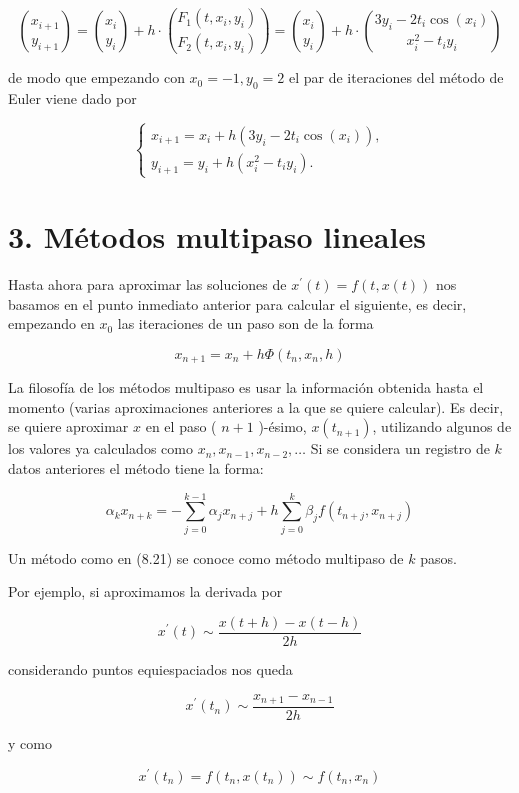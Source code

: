 \documentclass[10pt]{article}
\begin{document}
$$
\binom{x_{i+1}}{y_{i+1}}=\binom{x_{i}}{y_{i}}+h \cdot\binom{F_{1}\left(t, x_{i}, y_{i}\right)}{F_{2}\left(t, x_{i}, y_{i}\right)}=\binom{x_{i}}{y_{i}}+h \cdot\binom{3 y_{i}-2 t_{i} \cos \left(x_{i}\right)}{x_{i}^{2}-t_{i} y_{i}}
$$

de modo que empezando con $x_{0}=-1, y_{0}=2$ el par de iteraciones del método de Euler viene dado por

$$
\left\{\begin{array}{l}
x_{i+1}=x_{i}+h\left(3 y_{i}-2 t_{i} \cos \left(x_{i}\right)\right), \\
y_{i+1}=y_{i}+h\left(x_{i}^{2}-t_{i} y_{i}\right) .
\end{array}\right.
$$

\section*{3. Métodos multipaso lineales}
Hasta ahora para aproximar las soluciones de $x^{\prime}(t)=f(t, x(t))$ nos basamos en el punto inmediato anterior para calcular el siguiente, es decir, empezando en $x_{0}$ las iteraciones de un paso son de la forma

$$
x_{n+1}=x_{n}+h \Phi\left(t_{n}, x_{n}, h\right)
$$

La filosofía de los métodos multipaso es usar la información obtenida hasta el momento (varias aproximaciones anteriores a la que se quiere calcular). Es decir, se quiere aproximar $x$ en el paso ( $n+1$ )-ésimo, $x\left(t_{n+1}\right)$, utilizando algunos de los valores ya calculados como $x_{n}, x_{n-1}, x_{n-2}, \ldots$ Si se considera un registro de $k$ datos anteriores el método tiene la forma:


\begin{equation*}
\alpha_{k} x_{n+k}=-\sum_{j=0}^{k-1} \alpha_{j} x_{n+j}+h \sum_{j=0}^{k} \beta_{j} f\left(t_{n+j}, x_{n+j}\right) \tag{8.21}
\end{equation*}


Un método como en (8.21) se conoce como método multipaso de $k$ pasos.

Por ejemplo, si aproximamos la derivada por

$$
x^{\prime}(t) \sim \frac{x(t+h)-x(t-h)}{2 h}
$$

considerando puntos equiespaciados nos queda

$$
x^{\prime}\left(t_{n}\right) \sim \frac{x_{n+1}-x_{n-1}}{2 h}
$$

y como

$$
x^{\prime}\left(t_{n}\right)=f\left(t_{n}, x\left(t_{n}\right)\right) \sim f\left(t_{n}, x_{n}\right)
$$
\end{document}
